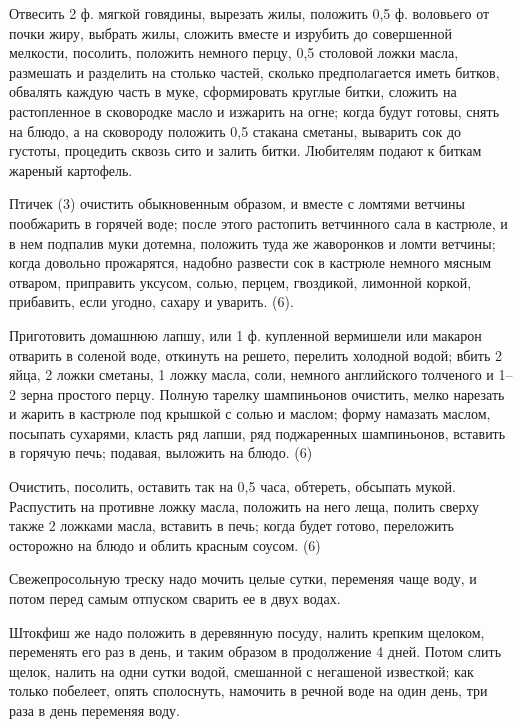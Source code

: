 
Отвесить 2 ф. мягкой говядины, вырезать жилы, положить 0,5 ф. воловьего от почки жиру, выбрать жилы, сложить вместе и изрубить до совершенной мелкости, посолить, положить немного перцу, 0,5 столовой ложки масла, размешать и разделить на столько частей, сколько предполагается иметь битков, обвалять каждую часть в муке, сформировать круглые битки, сложить на растопленное в сковородке масло и изжарить на огне; когда будут готовы, снять на блюдо, а на сковороду положить 0,5 стакана сметаны, выварить сок до густоты, процедить сквозь сито и залить битки. Любителям подают к биткам жареный картофель.


Птичек (3) очистить обыкновенным образом, и вместе с ломтями ветчины пообжарить в горячей воде; после этого растопить ветчинного сала в кастрюле, и в нем подпалив муки дотемна, положить туда же жаворонков и ломти ветчины; когда довольно прожарятся, надобно развести сок в кастрюле немного мясным отваром, приправить уксусом, солью, перцем, гвоздикой, лимонной коркой, прибавить, если угодно, сахару и уварить. (6). 


Приготовить домашнюю лапшу, или 1 ф. купленной вермишели или макарон отварить в соленой воде, откинуть на решето, перелить холодной водой; вбить 2 яйца, 2 ложки сметаны, 1 ложку масла, соли, немного английского толченого и 1--2 зерна простого перцу. Полную тарелку шампиньонов очистить, мелко нарезать и жарить в кастрюле под крышкой с солью и маслом; форму намазать маслом, посыпать сухарями, класть ряд лапши, ряд поджаренных шампиньонов, вставить в горячую печь; подавая, выложить на блюдо. (6) 


Очистить, посолить, оставить так на 0,5 часа, обтереть, обсыпать мукой. Распустить на противне ложку масла, положить на него леща, полить сверху также 2 ложками масла, вставить в печь; когда будет готово, переложить осторожно на блюдо и облить красным соусом. (6) 


Свежепросольную треску надо мочить целые сутки, переменяя чаще воду, и потом перед самым отпуском сварить ее в двух водах. 

Штокфиш же надо положить в деревянную посуду, налить крепким щелоком, переменять его раз в день, и таким образом в продолжение 4 дней. Потом слить щелок, налить на одни сутки водой, смешанной с негашеной известкой; как только побелеет, опять сполоснуть, намочить в речной воде на один день, три раза в день переменяя воду. 

